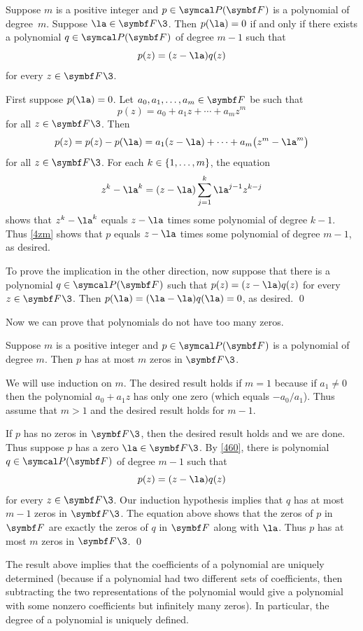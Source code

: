 {Suppose $m$ is a positive integer and $p \in \P(\F{})$ is a polynomial of degree~$m$. Suppose $\la \in \F{}\3$. Then $p(\la) = 0$ if and only if there exists a polynomial $q \in \P(\F{})$ of degree $m-1$ such that
\[
p(z) = (z-\la)q(z)
\]
for every $z \in \F{}\3$.}

\proof
First suppose $p(\la) = 0$. Let $a_0, a_1, \ldots, a_m \in \F{}$ be such that
\[
p(z) = a_0 + a_1 z + \cdots + a_m z^m
\]
for all $z \in \F{}\3$. Then
\begin{equation} \label{4zm}
p(z) = p(z) - p(\la) = a_1(z-\la) + \cdots + a_m \paren[\big]{z^m - \la^m}
\end{equation}%
for all $z \in \F{}\3$. For each $k \in \{1, \ldots, m\}$, the equation
\[
z^k - \la^k =  (z - \la) \sum_{j=1}^{k} \la^{j-1} z^{k-j}
\]
shows that $z^k - \la^k$ equals $z - \la$ times some polynomial of degree $k-1$. Thus \ref{4zm} shows that $p$ equals $z - \la$ times some polynomial of degree $m-1$, as desired.

To prove the implication in the other direction, now suppose that there is a polynomial $q \in \P(\F{})$
such that $p(z) = (z - \la) q(z)$ for every $z \in \F{}\3$. Then $p(\la) = (\la - \la) q(\la) = 0$, as desired.
\qed

Now we can prove that polynomials do not have too many zeros.

{Suppose $m$ is a positive integer and $p \in \P(\F{})$ is a polynomial of degree $m$. Then $p$ has at most $m$ zeros in $\F{}\3$.}

\proof
We will use induction on $m$. The desired result holds if $m = 1$ because if $a_1 \ne 0$ then the polynomial $a_0 + a_1 z$ has only one zero (which equals $-a_0 / a_1$). Thus assume that $m > 1$ and the desired result holds for $m-1$.

If $p$ has no zeros in $\F{}\3$, then the desired result holds and we are done. Thus suppose $p$ has a zero $\la \in \F{}\3$. By \ref{460}, there is polynomial $q \in \P(\F{})$ of degree $m-1$ such that
\[
p(z) = (z - \la) q(z)
\]
for every $z \in \F{}\3$. Our induction hypothesis implies that $q$ has at most $m-1$ zeros in $\F{}\3$. The equation above shows that the zeros of $p$ in $\F{}$ are exactly the zeros of $q$ in $\F{}$ along with $\la$. Thus $p$ has at most $m$ zeros in $\F{}\3$.
\qed

The result above implies that the coefficients of a polynomial are uniquely determined (because if a polynomial had two different sets of coefficients, then subtracting the two representations of the polynomial would give a polynomial with some nonzero coefficients but infinitely many zeros). In particular, the degree of a polynomial is uniquely defined.

